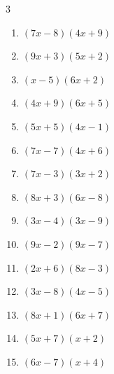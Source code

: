 \begin{multicols}{3}
\begin{enumerate}
  \item $(7x-8)(4x+9)$


  \item $(9x+3)(5x+2)$


  \item $(x-5)(6x+2)$


  \item $(4x+9)(6x+5)$


  \item $(5x+5)(4x-1)$


  \item $(7x-7)(4x+6)$


  \item $(7x-3)(3x+2)$


  \item $(8x+3)(6x-8)$


  \item $(3x-4)(3x-9)$


  \item $(9x-2)(9x-7)$


\columnbreak %

  \item $(2x+6)(8x-3)$


  \item $(3x-8)(4x-5)$


  \item $(8x+1)(6x+7)$


  \item $(5x+7)(x+2)$


  \item $(6x-7)(x+4)$


\end{enumerate}
\end{multicols}
